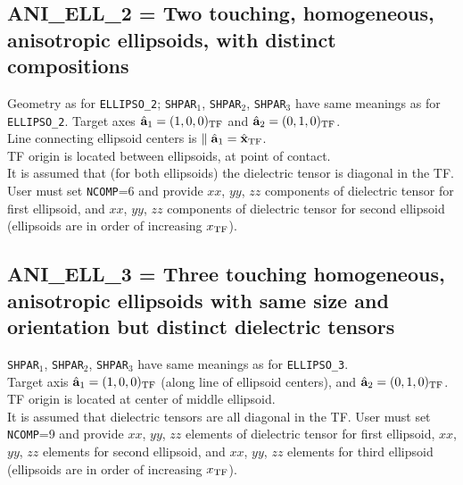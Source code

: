 \subsection{ ANI\_ELL\_2 = Two touching, homogeneous, anisotropic 
	    ellipsoids, with distinct compositions
            \label{sec:ANI_ELL_2}}
	Geometry as for {\tt ELLIPSO\_2};
	{\tt SHPAR$_1$}, {\tt SHPAR$_2$}, {\tt SHPAR}$_3$ 
        have same meanings as for {\tt ELLIPSO\_2}.  
	Target axes ${\hat{\bf a}}_1=(1,0,0)_{\rm TF}$ 
	and ${\hat{\bf a}}_2=(0,1,0)_{\rm TF}$.\\
	Line connecting ellipsoid centers is 
	$\parallel \hat{\bf a}_1 = \hat{\bf x}_{\rm TF}$.\\
	TF origin is located between ellipsoids, at point of contact.\\
	It is assumed that (for both ellipsoids) the dielectric tensor
	is diagonal in the TF.
	User must set {\tt NCOMP}=6 and provide 
	$xx$, $yy$, $zz$ components of dielectric tensor for 
	first ellipsoid, and $xx$, $yy$, $zz$ components of 
	dielectric tensor for second 
	ellipsoid (ellipsoids are in order of increasing $x_{\rm TF}$).
\subsection{ ANI\_ELL\_3 = Three touching homogeneous, anisotropic ellipsoids 
	    with same size and orientation but distinct dielectric tensors
            \label{sec:ANI_ELL_3}}
	{\tt SHPAR$_1$}, {\tt SHPAR$_2$}, {\tt SHPAR}$_3$ 
        have same meanings as for {\tt ELLIPSO\_3}.\\  
	Target axis ${\hat{\bf a}}_1=(1,0,0)_{\rm TF}$ 
	(along line of ellipsoid centers), and 
	${\hat{\bf a}}_2=(0,1,0)_{\rm TF}$.\\
	TF origin is located at center of middle ellipsoid.\\
	It is assumed that dielectric tensors 
	are all diagonal in the TF.
	User must set {\tt NCOMP}=9 and provide $xx$, $yy$, $zz$ 
	elements of dielectric tensor
	for first ellipsoid, $xx$, $yy$, $zz$ elements for second ellipsoid, 
	and $xx$, $yy$, $zz$ elements for third ellipsoid 
	(ellipsoids are in order of increasing $x_{\rm TF}$).
